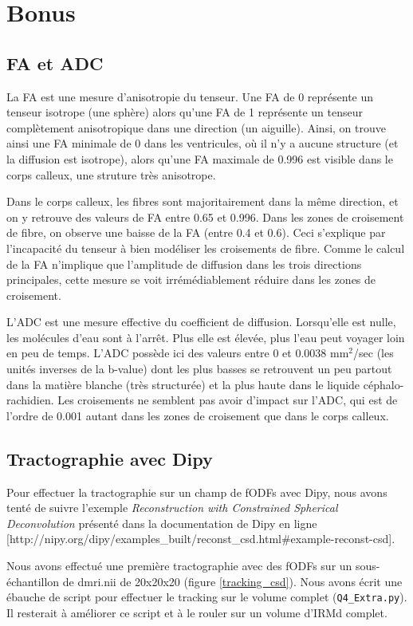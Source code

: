 \documentclass[a4paper]{article}
\begin{document}
\section{Bonus}

\subsection{FA et ADC}

La FA est une mesure d'anisotropie du tenseur. Une FA de 0 représente un tenseur isotrope (une sphère) alors qu'une FA de 1 représente un tenseur complètement anisotropique dans une direction (un aiguille). Ainsi, on trouve ainsi une FA minimale de 0 dans les ventricules, où il n'y a aucune structure (et la diffusion est isotrope), alors qu'une FA maximale de 0.996 est visible dans le corps calleux, une struture très anisotrope.

Dans le corps calleux, les fibres sont majoritairement dans la même direction, et on y retrouve des valeurs de FA entre 0.65 et 0.996. Dans les zones de croisement de fibre, on observe une baisse de la FA (entre 0.4 et 0.6). Ceci s'explique par l'incapacité du tenseur à bien modéliser les croisements de fibre. Comme le calcul de la FA n'implique que l'amplitude de diffusion dans les trois directions principales, cette mesure se voit irrémédiablement réduire dans les zones de croisement.

L'ADC est une mesure effective du coefficient de diffusion. Lorsqu'elle est nulle, les molécules d'eau sont à l'arrêt. Plus elle est élevée, plus l'eau peut voyager loin en peu de temps. L'ADC possède ici des valeurs entre 0 et 0.0038 mm$^2$/sec (les unités inverses de la b-value) dont les plus basses se retrouvent un peu partout dans la matière blanche (très structurée) et la plus haute dans le liquide céphalo-rachidien. Les croisements ne semblent pas avoir d'impact sur l'ADC, qui est de l'ordre de 0.001 autant dans les zones de croisement que dans le corps calleux.

\subsection{Tractographie avec Dipy}
Pour effectuer la tractographie sur un champ de fODFs avec Dipy, nous avons tenté de suivre l'exemple \textit{Reconstruction with Constrained Spherical Deconvolution} présenté dans la documentation de Dipy en ligne [http://nipy.org/dipy/examples\_built/reconst\_csd.html\#example-reconst-csd].

Nous avons effectué une première tractographie avec des fODFs sur un sous-échantillon de dmri.nii de 20x20x20 (figure \ref{tracking_csd}). Nous avons écrit une ébauche de script pour effectuer le tracking sur le volume complet (\lstinline{Q4_Extra.py}). Il resterait à améliorer ce script et à le rouler sur un volume d'IRMd complet.
\end{document}
